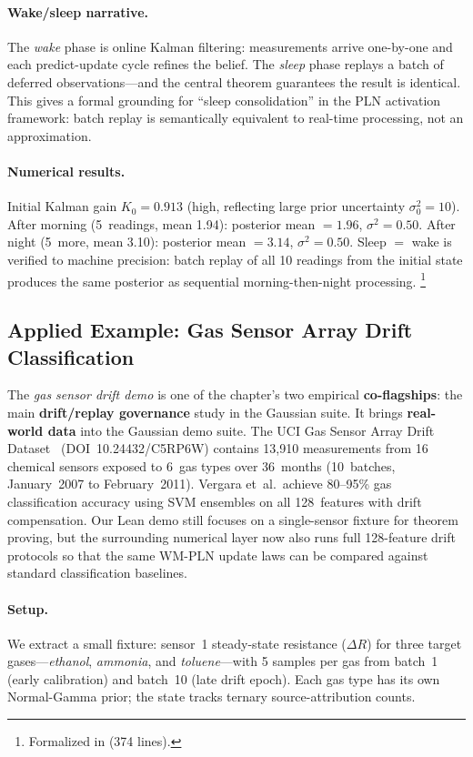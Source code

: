 \documentclass[11pt,openany]{report}
\begin{document}
\paragraph{Wake/sleep narrative.}
The \emph{wake} phase is online Kalman filtering: measurements arrive
one-by-one and each predict-update cycle refines the belief.  The
\emph{sleep} phase replays a batch of deferred observations---and
the central theorem guarantees the result is identical.  This gives a
formal grounding for ``sleep consolidation'' in the PLN activation
framework: batch replay is semantically equivalent to real-time
processing, not an approximation.

\paragraph{Numerical results.}
Initial Kalman gain $K_0 = 0.913$ (high, reflecting large prior
uncertainty $\sigma^2_0 = 10$).  After morning (5~readings, mean 1.94):
posterior mean $= 1.96$, $\sigma^2 = 0.50$.  After night
(5~more, mean 3.10): posterior mean $= 3.14$, $\sigma^2 = 0.50$.
Sleep $=$ wake is verified to machine precision: batch replay of all
10 readings from the initial state produces the same posterior as
sequential morning-then-night processing.%
\footnote{Formalized in  (374 lines).}

\subsection{Applied Example: Gas Sensor Array Drift Classification}

The \emph{gas sensor drift demo} is one of the chapter's two empirical
\textbf{co-flagships}: the main \textbf{drift/replay governance} study
in the Gaussian suite.  It brings \textbf{real-world data} into the
Gaussian demo suite.  The UCI Gas Sensor Array Drift
Dataset~\cite{Vergara2012GasSensorDrift} (DOI~10.24432/C5RP6W)
contains 13,910 measurements from 16 chemical sensors exposed to
6~gas types over 36~months (10~batches, January~2007 to
February~2011).  Vergara et~al.\ achieve 80--95\% gas classification
accuracy using SVM ensembles on all 128~features with drift
compensation.  Our Lean demo still focuses on a single-sensor fixture
for theorem proving, but the surrounding numerical layer now also runs
full 128-feature drift protocols so that the same WM-PLN update laws can
be compared against standard classification baselines.

\paragraph{Setup.}
We extract a small fixture: sensor~1 steady-state resistance ($\Delta R$)
for three target gases---\emph{ethanol}, \emph{ammonia}, and
\emph{toluene}---with 5 samples per gas from batch~1 (early calibration)
and batch~10 (late drift epoch).  Each gas type has its own
Normal-Gamma prior; the state tracks ternary source-attribution counts.
\end{document}

